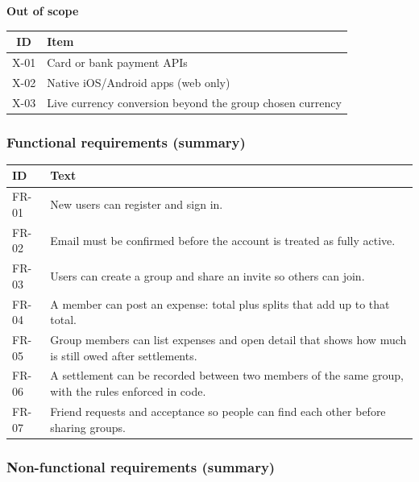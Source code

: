 \documentclass[11pt,a4paper]{article}
\begin{document}
\vspace{1em}
\textbf{Out of scope}

\begin{center}
\begin{tabular}{@{}cl@{}}
\toprule
\textbf{ID} & \textbf{Item} \\
\midrule
X-01 & Card or bank payment APIs \\
X-02 & Native iOS/Android apps (web only) \\
X-03 & Live currency conversion beyond the group chosen currency \\
\bottomrule
\end{tabular}
\end{center}

\subsubsection{Functional requirements (summary)}

\begin{center}
\begin{tabular}{@{}p{}p{}@{}}
\toprule
\textbf{ID} & \textbf{Text} \\
\midrule
FR-01 & New users can register and sign in. \\
FR-02 & Email must be confirmed before the account is treated as fully active. \\
FR-03 & Users can create a group and share an invite so others can join. \\
FR-04 & A member can post an expense: total plus splits that add up to that total. \\
FR-05 & Group members can list expenses and open detail that shows how much is still owed after settlements. \\
FR-06 & A settlement can be recorded between two members of the same group, with the rules enforced in code. \\
FR-07 & Friend requests and acceptance so people can find each other before sharing groups. \\
\bottomrule
\end{tabular}
\end{center}

\subsubsection{Non-functional requirements (summary)}
\end{document}
